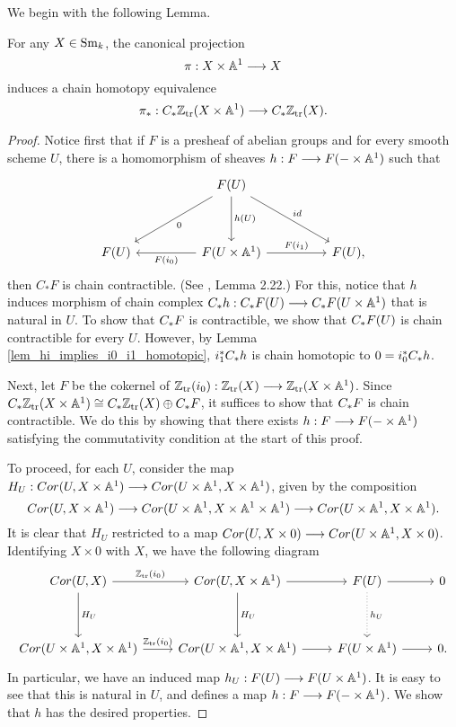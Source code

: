 We begin with the following Lemma.

\begin{lem}
For any $X \in \mathrm{Sm}_{k}$, the canonical projection
\[
\pi: X \times \mathbb{A}^1 \longrightarrow X
\]
induces a chain homotopy equivalence
\[
\pi_*: C_{*} \mathbb{Z}_{\mathrm{tr}}(X \times \mathbb{A}^1) \longrightarrow C_{*} \mathbb{Z}_{\mathrm{tr}}(X).
\]
\end{lem}

\begin{proof}
Notice first that if $F$ is a presheaf of abelian groups and for
every smooth scheme $U$, there is a homomorphism of sheaves $h:
F \longrightarrow F(- \times \mathbb{A}^1)$ such that
\begin{equation}\label{eq_contr_cond}
\begin{tikzcd}[row sep=huge, column sep=huge]
{}&
F(U) \arrow{ld}{0} \arrow{d}{h(U)} \arrow{rd}{id} \\
F(U) &
F(U \times \A^1) \arrow{l}{F(i_0)} \arrow{r}{F(i_1)} &
F(U),
\end{tikzcd}
\end{equation}
then $C_*F$ is chain contractible. (See \cite{MVW}, Lemma 2.22.) 
For this, notice that $h$ induces morphism of chain complex 
$C_{*} h : C_{*} F(U) \longrightarrow C_{*} F(U \times \mathbb{A}^1)$ that is 
natural in $U$. To show that $C_{*} F$ is contractible, we show 
that $C_{*} F(U)$ is chain contractible for every $U$. However, 
by Lemma \ref{lem_hi_implies_i0_i1_homotopic}, $i_1^* C_{*} h$ 
is chain homotopic to $0 = i_0^* C_{*} h$.

Next, let $F$ be the cokernel of $\mathbb{Z}_{\mathrm{tr}}(i_0): \mathbb{Z}_{\mathrm{tr}}(X) \longrightarrow \mathbb{Z}_{\mathrm{tr}}(X 
\times \mathbb{A}^1)$. Since $C_{*} \mathbb{Z}_{\mathrm{tr}}(X \times \mathbb{A}^1) \cong C_{*}
\mathbb{Z}_{\mathrm{tr}}(X) \oplus C_{*} F$, it suffices to show that $C_{*} F$
is chain contractible. We do this by showing that there exists
$h: F \longrightarrow F(- \times \mathbb{A}^1)$ satisfying the commutativity condition 
at the start of this proof.

To proceed, for each $U$, consider the map $H_U: Cor(U, X \times 
\mathbb{A}^1) \longrightarrow Cor(U \times \mathbb{A}^1, X \times \mathbb{A}^1)$, given by the 
composition
\[
Cor(U, X \times \mathbb{A}^1) \longrightarrow
Cor(U \times \mathbb{A}^1, X \times \mathbb{A}^1 \times \mathbb{A}^1) \longrightarrow
Cor(U \times \mathbb{A}^1, X \times \mathbb{A}^1).
\]
It is clear that $H_U$ restricted to a map $Cor(U, X \times 0)
\longrightarrow Cor(U \times \mathbb{A}^1, X \times 0)$. Identifying $X \times 0$
with $X$, we have the following diagram
\[
\begin{tikzcd}[row sep=huge]
\Cor(U, X) \arrow{r}{\Ztr(i_0)} \arrow{d}{H_U} &
\Cor(U, X \times \A^1) \arrow{r} \arrow{d}{H_U} &
F(U) \arrow{r} \arrow[dotted]{d}{h_U}&
0 \\
\Cor(U \times \A^1, X \times \A^1) \arrow{r}{\Ztr(i_0)} &
\Cor(U \times \A^1, X \times \A^1) \arrow{r} &
F(U \times \A^1) \arrow{r} &
0.
\end{tikzcd}
\]
In particular, we have an induced map $h_U: F(U) \longrightarrow F(U \times 
\mathbb{A}^1)$. It is easy to see that this is natural in $U$, and defines 
a map $h : F \longrightarrow F( - \times \mathbb{A}^1)$. We show that $h$ has the
desired properties.


\end{proof}
